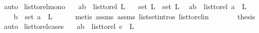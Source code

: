 \begin{isabellebody}
\ auto%
\endisatagproof
{\isafoldproof}%
%
\isadelimproof
\isanewline
%
\endisadelimproof
\isanewline
\isanewline
{}\isamarkupfalse%
\ list{\isacharunderscore}{\kern0pt}to{\isacharunderscore}{\kern0pt}rel{\isacharunderscore}{\kern0pt}mono{}{\isacharcolon}{\kern0pt}\isanewline
\ \ \ {\isachardoublequoteopen}{\isacharparenleft}{\kern0pt}a{\isacharcomma}{\kern0pt}b{\isacharparenright}{\kern0pt}\ {\isasymin}\ list{\isacharunderscore}{\kern0pt}to{\isacharunderscore}{\kern0pt}rel\ {\isacharparenleft}{\kern0pt}L{\isacharparenright}{\kern0pt}{\isachardoublequoteclose}\isanewline
\ \ \ {\isachardoublequoteopen}set\ L{}\ {\isacharequal}{\kern0pt}\ set\ L{\isachardoublequoteclose}\isanewline
{}\ \ {\isachardoublequoteopen}{\isacharparenleft}{\kern0pt}a{\isacharcomma}{\kern0pt}b{\isacharparenright}{\kern0pt}\ {\isasymin}\ list{\isacharunderscore}{\kern0pt}to{\isacharunderscore}{\kern0pt}rel\ {\isacharparenleft}{\kern0pt}a\ {\isacharhash}{\kern0pt}\ L{}{\isacharparenright}{\kern0pt}{\isachardoublequoteclose}\isanewline
%
\isadelimproof
%
\endisadelimproof
%
\isatagproof
{}\isamarkupfalse%
\ {\isacharminus}{\kern0pt}\isanewline
\ \ \isamarkupfalse%
\ {\isachardoublequoteopen}b\ {\isasymin}\ set\ {\isacharparenleft}{\kern0pt}a\ {\isacharhash}{\kern0pt}\ L{}{\isacharparenright}{\kern0pt}{\isachardoublequoteclose}\isanewline
\ \ \ \ \isamarkupfalse%
\ {\isacharparenleft}{\kern0pt}metis\ assms{\isacharparenleft}{\kern0pt}{}{\isacharparenright}{\kern0pt}\ assms{\isacharparenleft}{\kern0pt}{}{\isacharparenright}{\kern0pt}\ list{\isachardot}{\kern0pt}set{\isacharunderscore}{\kern0pt}intros{\isacharparenleft}{\kern0pt}{}{\isacharparenright}{\kern0pt}\ list{\isacharunderscore}{\kern0pt}to{\isacharunderscore}{\kern0pt}rel{\isacharunderscore}{\kern0pt}in{\isacharparenright}{\kern0pt}\ \ \isanewline
\ \ \isamarkupfalse%
\ \isamarkupfalse%
\ {\isacharquery}{\kern0pt}thesis\ \isamarkupfalse%
\ auto\isanewline
{}\isamarkupfalse%
%
\endisatagproof
{\isafoldproof}%
%
\isadelimproof
\isanewline
%
\endisadelimproof
\isanewline
{}\isamarkupfalse%
\ list{\isacharunderscore}{\kern0pt}to{\isacharunderscore}{\kern0pt}rel{\isacharunderscore}{\kern0pt}cases{\isacharcolon}{\kern0pt}\isanewline
\ \ \ {\isachardoublequoteopen}{\isacharparenleft}{\kern0pt}a{\isacharcomma}{\kern0pt}b{\isacharparenright}{\kern0pt}\ {\isasymin}\ list{\isacharunderscore}{\kern0pt}to{\isacharunderscore}{\kern0pt}rel\ {\isacharparenleft}{\kern0pt}c\ {\isacharhash}{\kern0pt}\ L{\isacharparenright}{\kern0pt}{\isachardoublequoteclose}\isanewline

\end{isabellebody}
